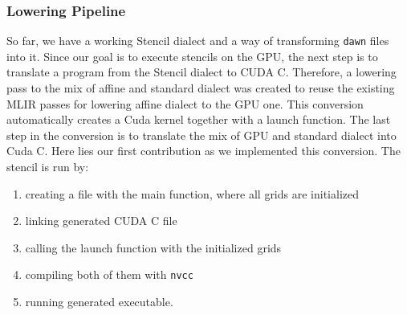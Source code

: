 \documentclass[sigplan,\review anonymous]{acmart}
\begin{document}
\subsubsection{Lowering Pipeline}
So far, we have a working Stencil dialect and a way of transforming
\texttt{dawn} files into it. Since our goal is to execute stencils on the GPU,
the next step is to translate a program from the Stencil dialect to CUDA C.
Therefore, a lowering pass to the mix of affine and standard dialect was
created to reuse the existing MLIR passes for lowering affine dialect to the
GPU one. This conversion automatically creates a Cuda kernel together with a
launch function. The last step in the conversion is to translate the mix of
GPU and standard dialect into Cuda C. Here lies our first contribution as we
implemented this conversion. The stencil is run by:
\begin{enumerate}
  \item creating a file with the main function, where all grids are initialized
  \item linking generated CUDA C file
  \item calling the launch function with the initialized grids
  \item compiling both of them with \texttt{nvcc}
  \item running generated executable.
\end{enumerate}
\end{document}
